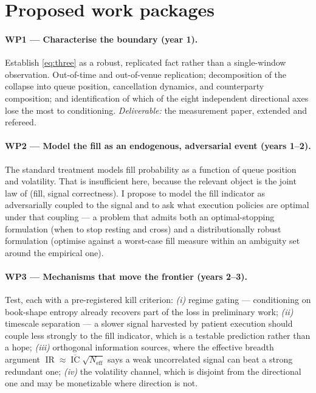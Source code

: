 \documentclass[11pt,a4paper]{article}
\DeclareMathOperator{\IC}{IC}
\DeclareMathOperator{\IR}{IR}
\begin{document}
\section{Proposed work packages}

\paragraph{WP1 --- Characterise the boundary (year 1).} Establish \eqref{eq:three} as a robust,
replicated fact rather than a single-window observation. Out-of-time and out-of-venue replication;
decomposition of the collapse into queue position, cancellation dynamics, and counterparty
composition; and identification of which of the eight independent directional axes lose the most to
conditioning. \emph{Deliverable:} the measurement paper, extended and refereed.

\paragraph{WP2 --- Model the fill as an endogenous, adversarial event (years 1--2).} The standard
treatment models fill probability as a function of queue position and volatility. That is
insufficient here, because the relevant object is the joint law of (fill, signal correctness). I
propose to model the fill indicator as adversarially coupled to the signal and to ask what execution
policies are optimal under that coupling --- a problem that admits both an optimal-stopping
formulation (when to stop resting and cross) and a distributionally robust formulation (optimise
against a worst-case fill measure within an ambiguity set around the empirical one).

\paragraph{WP3 --- Mechanisms that move the frontier (years 2--3).} Test, each with a pre-registered
kill criterion: \emph{(i)} regime gating --- conditioning on book-shape entropy already recovers
part of the loss in preliminary work; \emph{(ii)} timescale separation --- a slower signal harvested
by patient execution should couple less strongly to the fill indicator, which is a testable
prediction rather than a hope; \emph{(iii)} orthogonal information sources, where the effective
breadth argument $\IR \approx \overline{\IC}\sqrt{N_{\text{eff}}}$ says a weak uncorrelated signal
can beat a strong redundant one; \emph{(iv)} the volatility channel, which is disjoint from the
directional one and may be monetizable where direction is not.
\end{document}
